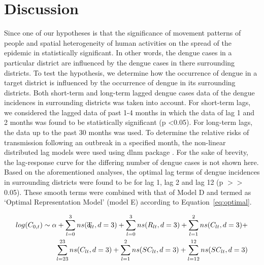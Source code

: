 \documentclass{bmcart}
\begin{document}

\section{Discussion} \label{discussion}

Since one of our hypotheses is that the significance of movement patterns of people and spatial heterogeneity of human activities on the spread of the epidemic in statistically significant. In other words, the dengue cases in a particular district are influenced by the dengue cases in there surrounding districts. To test the hypothesis, we determine how the occurrence of dengue in a target district is influenced by the occurrence of dengue in its surrounding districts. Both short-term and long-term lagged dengue cases data of the dengue incidences in surrounding districts was taken into account. For short-term lags, we considered the lagged data of past 1-4 months in which the data of lag 1 and 2 months was found to be statistically significant (p \textless 0.05). For long-term lags, the data up to the past 30 months was used. To determine the relative risks of transmission following an outbreak in a specified month, the non-linear distributed lag models were used using dlnm package \cite{gasparrini2011distributed}. For the sake of brevity, the lag-response curve for the differing number of dengue cases is not shown here. Based on the aforementioned analyses, the optimal lag terms of dengue incidences in surrounding districts were found to be for lag 1, lag 2 and lag 12 (p \(>\!\!>\) 0.05).  These smooth terms were combined with that of Model D and termed as `Optimal Representation Model' (model E) according to Equation~\ref{eq:optimal}.

\begin{equation}
\begin{aligned}
\label{eq:optimal}
log (C_{0,t}) \sim \alpha +  \sum_{l=0}^{3} ns(\rlap{T}c _ {lt}, d =3) + \sum_{l=0}^{3} ns(R_ {lt}, d =3) +\sum_{l=1}^{2} ns(C_ {lt}, d =3)  + \\
\sum_{l=23}^{23} ns(C_ {lt}, d =3) + \sum_{l=1}^{2} ns(SC_ {lt}, d =3) + \sum_{l=12}^{12} ns(SC_ {lt}, d =3)
\end{aligned}
\end{equation}
\end{document}
